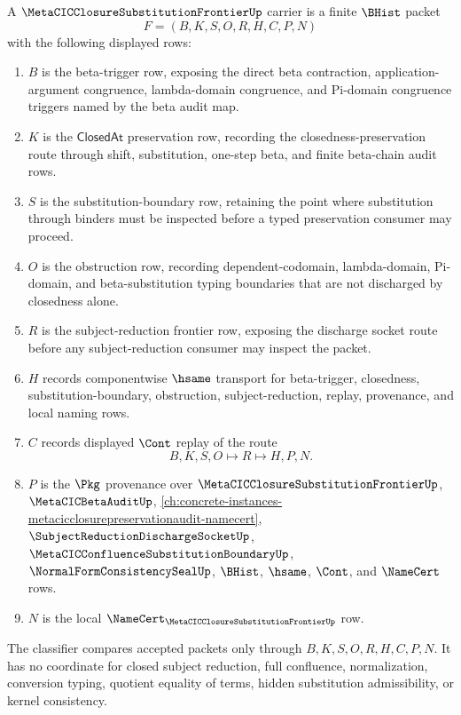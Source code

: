 \begin{definition}
\label{def:metacic-closure-substitution-frontier-carrier}
A $\MetaCICClosureSubstitutionFrontierUp$ carrier is a finite $\BHist$ packet
$$
F=(B,K,S,O,R,H,C,P,N)
$$
with the following displayed rows:
\begin{enumerate}
\item $B$ is the beta-trigger row, exposing the direct beta contraction, application-argument congruence, lambda-domain congruence, and Pi-domain congruence triggers named by the beta audit map.
\item $K$ is the $\mathsf{ClosedAt}$ preservation row, recording the closedness-preservation route through shift, substitution, one-step beta, and finite beta-chain audit rows.
\item $S$ is the substitution-boundary row, retaining the point where substitution through binders must be inspected before a typed preservation consumer may proceed.
\item $O$ is the obstruction row, recording dependent-codomain, lambda-domain, Pi-domain, and beta-substitution typing boundaries that are not discharged by closedness alone.
\item $R$ is the subject-reduction frontier row, exposing the discharge socket route before any subject-reduction consumer may inspect the packet.
\item $H$ records componentwise $\hsame$ transport for beta-trigger, closedness, substitution-boundary, obstruction, subject-reduction, replay, provenance, and local naming rows.
\item $C$ records displayed $\Cont$ replay of the route
$$
B,K,S,O \longmapsto R \longmapsto H,P,N .
$$
\item $P$ is the $\Pkg$ provenance over $\MetaCICClosureSubstitutionFrontierUp$, $\MetaCICBetaAuditUp$, \autoref{ch:concrete-instances-metacicclosurepreservationaudit-namecert}, $\SubjectReductionDischargeSocketUp$, $\MetaCICConfluenceSubstitutionBoundaryUp$, $\NormalFormConsistencySealUp$, $\BHist$, $\hsame$, $\Cont$, and $\NameCert$ rows.
\item $N$ is the local $\NameCert_{\MetaCICClosureSubstitutionFrontierUp}$ row.
\end{enumerate}
The classifier compares accepted packets only through $B,K,S,O,R,H,C,P,N$. It has no coordinate for closed subject reduction, full confluence, normalization, conversion typing, quotient equality of terms, hidden substitution admissibility, or kernel consistency.
\end{definition}

